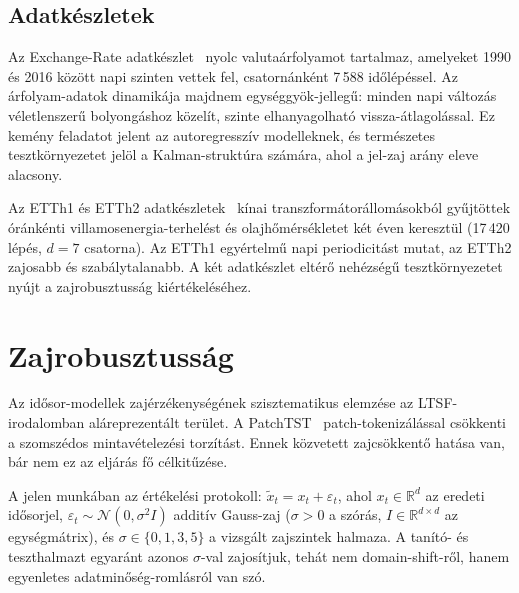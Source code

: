 \subsection{Adatkészletek}
\label{sec:datasets}

Az Exchange-Rate adatkészlet~\cite{lai2018modeling} nyolc valutaárfolyamot
tartalmaz, amelyeket 1990 és 2016 között napi szinten vettek fel,
csatornánként 7\,588 időlépéssel. Az árfolyam-adatok dinamikája majdnem egységgyök-jellegű: minden napi
változás véletlenszerű bolyongáshoz közelít, szinte elhanyagolható
vissza-átlagolással. Ez kemény feladatot jelent az autoregresszív modelleknek,
és természetes tesztkörnyezetet jelöl a Kalman-struktúra számára,
ahol a jel-zaj arány eleve alacsony.

Az ETTh1 és ETTh2 adatkészletek~\cite{zhou2021informer} kínai
transzformátorállomásokból gyűjtöttek óránkénti villamosenergia-terhelést
és olajhőmérsékletet két éven keresztül (17\,420 lépés, $d=7$ csatorna).
Az ETTh1 egyértelmű napi periodicitást mutat, az ETTh2 zajosabb és
szabálytalanabb. A két adatkészlet eltérő nehézségű tesztkörnyezetet
nyújt a zajrobusztusság kiértékeléséhez.

\section{Zajrobusztusság}
\label{sec:robustness}

Az idősor-modellek zajérzékenységének szisztematikus elemzése az
LTSF-irodalomban aláreprezentált terület.
A PatchTST~\cite{nie2022patchtst} patch-tokenizálással csökkenti a
szomszédos mintavételezési torzítást. Ennek közvetett zajcsökkentő hatása
van, bár nem ez az eljárás fő célkitűzése.

A jelen munkában az értékelési protokoll: $\tilde{x}_t = x_t + \varepsilon_t$,
ahol $x_t \in \mathbb{R}^d$ az eredeti idősorjel, $\varepsilon_t \sim \mathcal{N}(0, \sigma^2 I)$
additív Gauss-zaj ($\sigma > 0$ a szórás, $I \in \mathbb{R}^{d \times d}$
az egységmátrix), és $\sigma \in \{0, 1, 3, 5\}$ a vizsgált zajszintek halmaza.
A tanító- és teszthalmazt egyaránt azonos $\sigma$-val zajosítjuk,
tehát nem domain-shift-ről, hanem egyenletes adatminőség-romlásról van szó.
